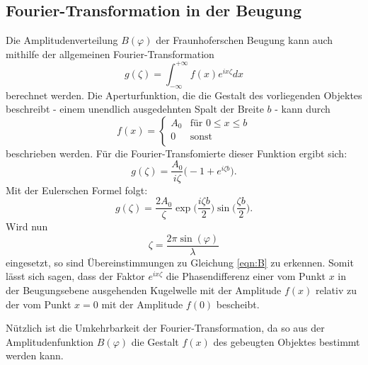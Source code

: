 \subsection{Fourier-Transformation in der Beugung}
Die Amplitudenverteilung $B(\varphi)$ der Fraunhoferschen Beugung kann auch mithilfe der
allgemeinen Fourier-Transformation
\begin{equation}
    g(\zeta) = \int_{-\infty}^{+\infty}f(x) e^{ix\zeta} dx
\end{equation}
berechnet werden.
Die Aperturfunktion, die die Gestalt des vorliegenden Objektes beschreibt -
einem unendlich ausgedehnten Spalt der Breite $b$ - kann durch
\[f(x)=\begin{cases}
A_0 & \text{für } 0≤x≤b \\
0   & \text{sonst} \\
\end{cases}\]
beschrieben werden. Für die Fourier-Transfomierte dieser Funktion ergibt sich:
\begin{equation}
  g(\zeta) = \frac{A_0}{i\zeta} \bigg(-1+ e^{i\zeta b}\bigg).
\end{equation}
Mit der Eulerschen Formel folgt:
\begin{equation}
  g(\zeta) = \frac{2A_0}{\zeta} \exp{\bigg(\frac{i\zeta b }{2}\bigg)}\sin{\bigg(\frac{\zeta b}{2}\bigg)}.
\end{equation}
Wird nun
\begin{equation}
  \zeta = \frac{2 \pi \sin{(\varphi)}}{\lambda}
\end{equation}
eingesetzt, so sind Übereinstimmungen zu Gleichung \eqref{eqn:B} zu erkennen.
Somit lässt sich sagen, dass der Faktor $e^{ix\zeta}$ die Phasendifferenz einer vom
Punkt $x$ in der Beugungsebene ausgehenden Kugelwelle mit der Amplitude $f(x)$
relativ zu der vom Punkt $x=0$ mit der Amplitude $f(0)$ bescheibt.

Nützlich ist die Umkehrbarkeit der Fourier-Transformation, da so aus der
Amplitudenfunktion $B(\varphi)$ die Gestalt $f(x)$ des gebeugten Objektes bestimmt
werden kann.
